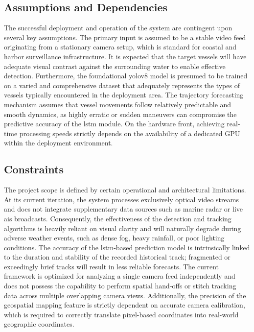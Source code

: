 \subsection{Assumptions and Dependencies}
The successful deployment and operation of the system are contingent upon several key assumptions. The primary input is assumed to be a stable video feed originating from a stationary camera setup, which is standard for coastal and harbor surveillance infrastructure. It is expected that the target vessels will have adequate visual contrast against the surrounding water to enable effective detection. Furthermore, the foundational \gls{yolov8} model is presumed to be trained on a varied and comprehensive dataset that adequately represents the types of vessels typically encountered in the deployment area. The trajectory forecasting mechanism assumes that vessel movements follow relatively predictable and smooth dynamics, as highly erratic or sudden maneuvers can compromise the predictive accuracy of the \gls{lstm} module. On the hardware front, achieving real-time processing speeds strictly depends on the availability of a dedicated GPU within the deployment environment.

\subsection{Constraints}
The project scope is defined by certain operational and architectural limitations. At its current iteration, the system processes exclusively optical video streams and does not integrate supplementary data sources such as marine radar or live \gls{ais} broadcasts. Consequently, the effectiveness of the detection and tracking algorithms is heavily reliant on visual clarity and will naturally degrade during adverse weather events, such as dense fog, heavy rainfall, or poor lighting conditions. The accuracy of the \gls{lstm}-based prediction model is intrinsically linked to the duration and stability of the recorded historical track; fragmented or exceedingly brief tracks will result in less reliable forecasts. The current framework is optimized for analyzing a single camera feed independently and does not possess the capability to perform spatial hand-offs or stitch tracking data across multiple overlapping camera views. Additionally, the precision of the geospatial mapping feature is strictly dependent on accurate camera calibration, which is required to correctly translate pixel-based coordinates into real-world geographic coordinates.

